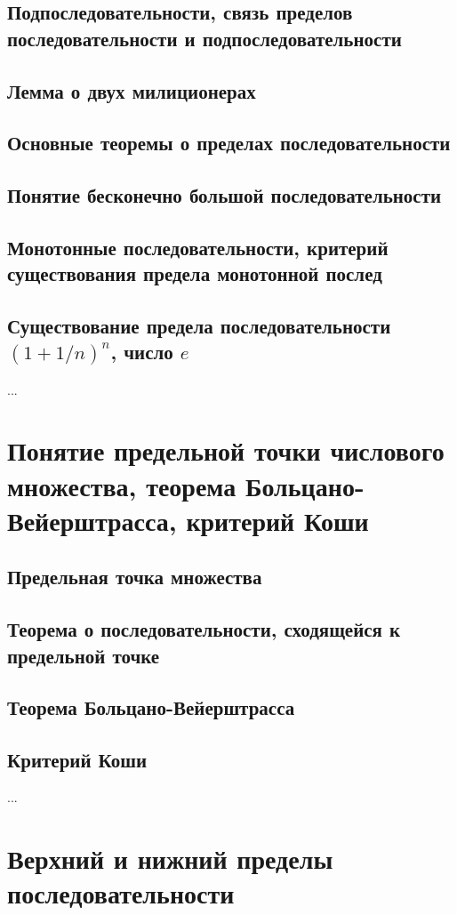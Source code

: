 \subsection{Подпоследовательности, связь пределов последовательности и подпоследовательности}
\subsection{Лемма о двух милиционерах}
\subsection{Основные теоремы о пределах последовательности}
\subsection{Понятие бесконечно большой последовательности}
\subsection{Монотонные последовательности, критерий существования предела монотонной послед}
\subsection{Существование предела последовательности $(1+1/n)^n$, число $e$ }
...

\section{Понятие предельной точки числового множества, теорема Больцано-Вейерштрасса, критерий Коши}
\subsection{Предельная точка множества}
\subsection{Теорема о последовательности, сходящейся к предельной точке}
\subsection{Теорема Больцано-Вейерштрасса}

\subsection{Критерий Коши}
...

\section{Верхний и нижний пределы последовательности}
